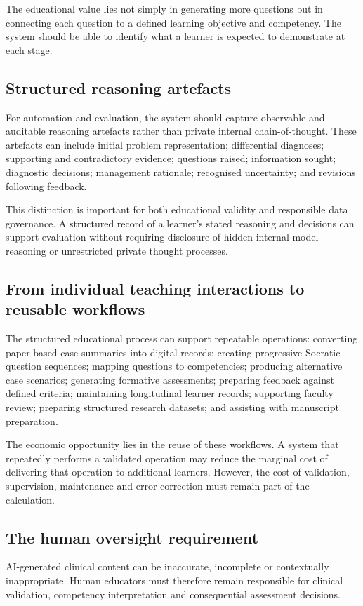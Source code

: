 \documentclass[11pt,a4paper]{article}
\begin{document}
The educational value lies not simply in generating more questions but in connecting each question to a defined learning objective and competency. The system should be able to identify what a learner is expected to demonstrate at each stage.

\subsection{Structured reasoning artefacts}
For automation and evaluation, the system should capture observable and auditable reasoning artefacts rather than private internal chain-of-thought. These artefacts can include initial problem representation; differential diagnoses; supporting and contradictory evidence; questions raised; information sought; diagnostic decisions; management rationale; recognised uncertainty; and revisions following feedback.

This distinction is important for both educational validity and responsible data governance. A structured record of a learner's stated reasoning and decisions can support evaluation without requiring disclosure of hidden internal model reasoning or unrestricted private thought processes.

\subsection{From individual teaching interactions to reusable workflows}
The structured educational process can support repeatable operations: converting paper-based case summaries into digital records; creating progressive Socratic question sequences; mapping questions to competencies; producing alternative case scenarios; generating formative assessments; preparing feedback against defined criteria; maintaining longitudinal learner records; supporting faculty review; preparing structured research datasets; and assisting with manuscript preparation.

The economic opportunity lies in the reuse of these workflows. A system that repeatedly performs a validated operation may reduce the marginal cost of delivering that operation to additional learners. However, the cost of validation, supervision, maintenance and error correction must remain part of the calculation.

\subsection{The human oversight requirement}
AI-generated clinical content can be inaccurate, incomplete or contextually inappropriate. Human educators must therefore remain responsible for clinical validation, competency interpretation and consequential assessment decisions.
\end{document}
